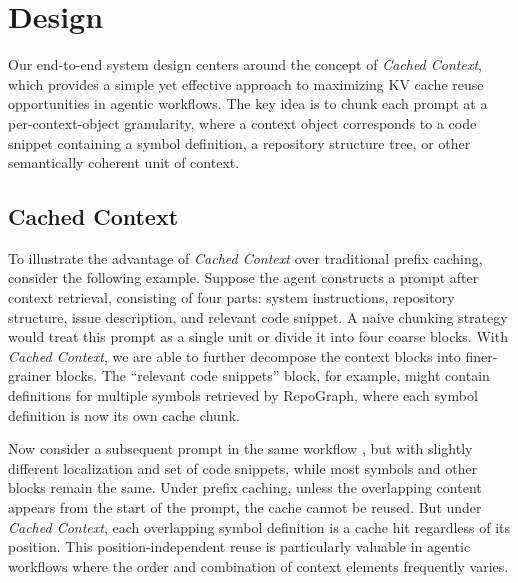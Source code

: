 \section{Design}
\label{sec:ch3_design}



Our end-to-end system design centers around the concept of \emph{Cached Context}, which provides a simple yet effective approach to maximizing KV cache reuse opportunities in agentic workflows. The key idea is to chunk each prompt at a per-context-object granularity, where a context object corresponds to a code snippet containing a symbol definition, a repository structure tree, or other semantically coherent unit of context.  

\subsection{Cached Context}
\label{sec:ch3_design_cc}
To illustrate the advantage of \textit{Cached Context} over traditional prefix caching, consider the following example. Suppose the agent constructs a prompt after context retrieval, consisting of four parts: system instructions, repository structure, issue description, and relevant code snippet. A naive chunking strategy would treat this prompt as a single unit or divide it into four coarse blocks. With \textit{Cached Context}, we are able to further decompose the context blocks into finer-grainer blocks. The ``relevant code snippets'' block, for example, might contain definitions for multiple symbols retrieved by RepoGraph, where each symbol definition is now its own cache chunk. 

Now consider a subsequent prompt in the same workflow , but with slightly different localization and set of code snippets, while most symbols and other blocks remain the same. Under prefix caching, unless the overlapping content appears from the start of the prompt, the cache cannot be reused. But under \textit{Cached Context}, each overlapping symbol definition is a cache hit regardless of its position. This position-independent reuse is particularly valuable in agentic workflows where the order and combination of context elements frequently varies. 

